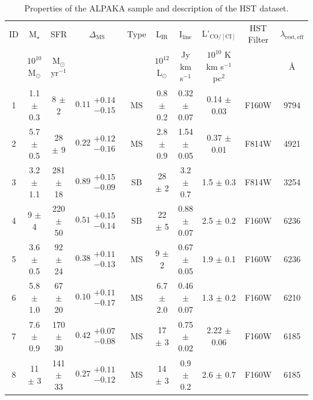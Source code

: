 \begin{table}[htbp!] 
\begin{center}
\caption{Properties of the ALPAKA sample and description of the HST dataset. 
}
\label{tab:mstar}
\begin{tabular}{cccccccccc}
\\
\hline\hline  \noalign{\smallskip}
ID  &  M$_{\star}$ & SFR & $\Delta_{\mathrm{MS}}$ & Type & L$_{\mathrm{IR}}$ & I$_{\mathrm{line}}$ &  L'$_{\mathrm{CO/[CI]}}$ &  HST Filter & $\lambda_{\mathrm{rest, eff}}$\\
 & $10^{10}$M$_{\odot}$ & M$_{\odot}$ yr$^{-1}$ & & & $10^{12}$ L$_{\odot}$ & Jy km s$^{-1}$ & $10^{10}$ K km s$^{-1}$ pc$^{2}$ & & \AA\\
\noalign{\smallskip}
\hline
\noalign{\medskip}
1 & 1.1 $\pm$ 0.3 & 8 $\pm$ 2 & $0.11 \substack{+ 0.14 \\- 0.15 }$ & MS & 0.8 $\pm$ 0.2 & 0.32 $\pm$ 0.07 & 0.14 $\pm$ 0.03 & F160W & 9794\\ 
2 & 5.7 $\pm$ 0.5 & 28 $\pm$ 9 & $0.22 \substack{+ 0.12 \\- 0.16 }$ &  MS & 2.8 $\pm$ 0.9 & 1.54 $\pm$ 0.05 & 0.37 $\pm$ 0.01 & F814W & 4921\\
3 & 3.2 $\pm$ 1.1 & 281 $\pm$ 18 & $0.89 \substack{+ 0.15 \\- 0.09 }$ & SB & 28 $\pm$ 2 & 3.2 $\pm$ 0.7 & 1.5 $\pm$ 0.3 & F814W & 3254\\
4 & 9 $\pm$ 4 & 220 $\pm$ 50 &  $0.51 \substack{+ 0.15 \\- 0.14 }$ & SB & 22 $\pm$ 5 & 0.88 $\pm$ 0.07 & 2.5 $\pm$ 0.2 & F160W & 6236\\
5 & 3.6 $\pm$ 0.5 & 92 $\pm$ 24 & $0.38 \substack{+ 0.11 \\- 0.13 }$ & MS & 9 $\pm$ 2 & 0.67 $\pm$ 0.05 & 1.9 $\pm$ 0.1 & F160W & 6236\\ 
6 & 5.8 $\pm$ 1.0 & 67 $\pm$ 20 & $0.10 \substack{+ 0.11 \\- 0.17 }$ & MS & 6.7 $\pm$ 2.0  & 0.46 $\pm$ 0.07 & 1.3 $\pm$ 0.2 & F160W & 6210\\ 
7 & 7.6 $\pm$ 0.9 & 170 $\pm$ 30 & $0.42 \substack{+ 0.07 \\- 0.08 }$ & MS & 17 $\pm$ 3 & 0.75 $\pm$ 0.02 & 2.22 $\pm$ 0.06 & F160W & 6185\\%
8 & 11 $\pm$ 3 & 141 $\pm$ 33 & $0.27 \substack{+ 0.11 \\- 0.12 }$ & MS & 14 $\pm$ 3 & 0.9 $\pm$ 0.2 & 2.6 $\pm$ 0.7 & F160W & 6185\\

\end{tabular}
\end{center}
\end{table}
